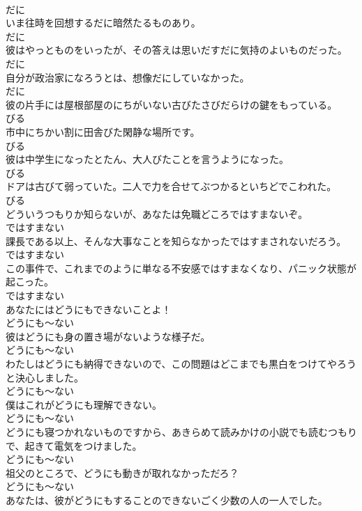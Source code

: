 \documentclass[8pt]{extreport}
\begin{document}
\begin{CJK}{UTF8}{min}
\\	だに
\\	いま往時を回想するだに暗然たるものあり。	
\\	だに
\\	彼はやっとものをいったが、その答えは思いだすだに気持のよいものだった。	
\\	だに
\\	自分が政治家になろうとは、想像だにしていなかった。	
\\	だに
\\	彼の片手には屋根部屋のにちがいない古びたさびだらけの鍵をもっている。	
\\	びる
\\	市中にちかい割に田舎びた閑静な場所です。	
\\	びる
\\	彼は中学生になったとたん、大人びたことを言うようになった。	
\\	びる
\\	ドアは古びて弱っていた。二人で力を合せてぶつかるといちどでこわれた。	
\\	びる
\\	どういうつもりか知らないが、あなたは免職どころではすまないぞ。	
\\	ではすまない
\\	課長である以上、そんな大事なことを知らなかったではすまされないだろう。	
\\	ではすまない
\\	この事件で、これまでのように単なる不安感ではすまなくなり、パニック状態が起こった。	
\\	ではすまない
\\	あなたにはどうにもできないことよ！	
\\	どうにも～ない
\\	彼はどうにも身の置き場がないような様子だ。	
\\	どうにも～ない
\\	わたしはどうにも納得できないので、この問題はどこまでも黒白をつけてやろうと決心しました。	
\\	どうにも～ない
\\	僕はこれがどうにも理解できない。	
\\	どうにも～ない
\\	どうにも寝つかれないものですから、あきらめて読みかけの小説でも読むつもりで、起きて電気をつけました。	
\\	どうにも～ない
\\	祖父のところで、どうにも動きが取れなかっただろ？	
\\	どうにも～ない
\\	あなたは、彼がどうにもすることのできないごく少数の人の一人でした。	

\end{CJK}
\end{document}
